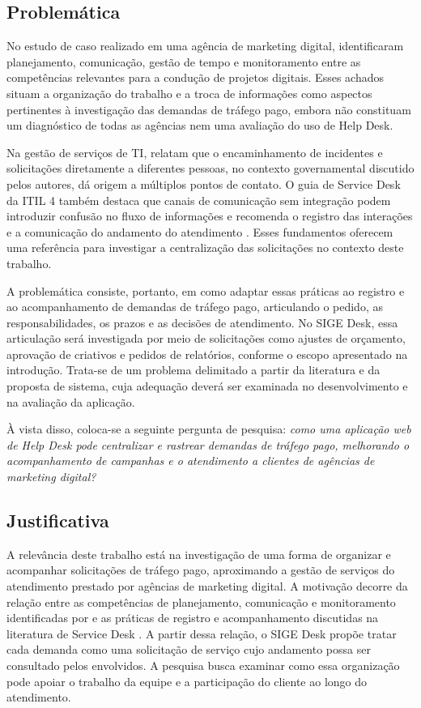 \subsection{\esp Problemática}

No estudo de caso realizado em uma agência de marketing digital,  identificaram planejamento, comunicação, gestão de tempo e monitoramento entre as competências relevantes para a condução de projetos digitais. Esses achados situam a organização do trabalho e a troca de informações como aspectos pertinentes à investigação das demandas de tráfego pago, embora não constituam um diagnóstico de todas as agências nem uma avaliação do uso de Help Desk.

Na gestão de serviços de TI,  relatam que o encaminhamento de incidentes e solicitações diretamente a diferentes pessoas, no contexto governamental discutido pelos autores, dá origem a múltiplos pontos de contato. O guia de Service Desk da ITIL 4 também destaca que canais de comunicação sem integração podem introduzir confusão no fluxo de informações e recomenda o registro das interações e a comunicação do andamento do atendimento \cite{servicedesk2023}. Esses fundamentos oferecem uma referência para investigar a centralização das solicitações no contexto deste trabalho.

A problemática consiste, portanto, em como adaptar essas práticas ao registro e ao acompanhamento de demandas de tráfego pago, articulando o pedido, as responsabilidades, os prazos e as decisões de atendimento. No SIGE Desk, essa articulação será investigada por meio de solicitações como ajustes de orçamento, aprovação de criativos e pedidos de relatórios, conforme o escopo apresentado na introdução. Trata-se de um problema delimitado a partir da literatura e da proposta de sistema, cuja adequação deverá ser examinada no desenvolvimento e na avaliação da aplicação.

À vista disso, coloca-se a seguinte pergunta de pesquisa: \textit{como uma aplicação web de Help Desk pode centralizar e rastrear demandas de tráfego pago, melhorando o acompanhamento de campanhas e o atendimento a clientes de agências de marketing digital?}

\subsection{\esp Justificativa}

A relevância deste trabalho está na investigação de uma forma de organizar e acompanhar solicitações de tráfego pago, aproximando a gestão de serviços do atendimento prestado por agências de marketing digital. A motivação decorre da relação entre as competências de planejamento, comunicação e monitoramento identificadas por  e as práticas de registro e acompanhamento discutidas na literatura de Service Desk \cite{firmansyah2022}. A partir dessa relação, o SIGE Desk propõe tratar cada demanda como uma solicitação de serviço cujo andamento possa ser consultado pelos envolvidos. A pesquisa busca examinar como essa organização pode apoiar o trabalho da equipe e a participação do cliente ao longo do atendimento.

